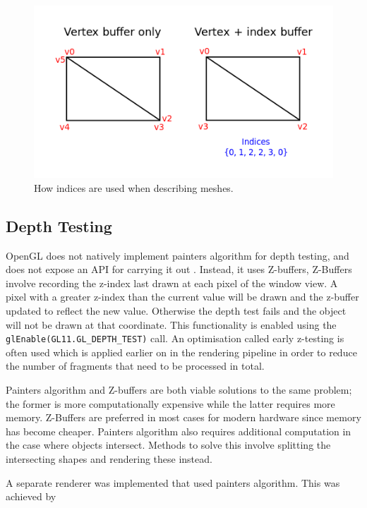 \documentclass[12pt]{article}
\begin{document}
\begin{figure}[!ht]
	\centering
	\includegraphics[width=\linewidth]{images/vertex_vs_index}
	\caption{How indices are used when describing meshes.}
	\label{fig:index_mesh}
\end{figure}

\subsection{Depth Testing}

OpenGL does not natively implement painters algorithm for depth testing, and does not expose an API for carrying it out .
Instead, it uses Z-buffers, 
Z-Buffers involve recording the z-index last drawn at each pixel of the window view. 
A pixel with a greater z-index than the current value will be drawn and the z-buffer updated to reflect the new value.
Otherwise the depth test fails and the object will not be drawn at that coordinate.
This functionality is enabled using the \texttt{glEnable(GL11.GL\_DEPTH\_TEST)} call.
An optimisation called early z-testing is often used which is applied earlier on in the rendering pipeline in order to reduce the number of fragments that need to be processed in total.

Painters algorithm and Z-buffers are both viable solutions to the same problem; the former is more computationally expensive while the latter requires more memory.
Z-Buffers are preferred in most cases for modern hardware since memory has become cheaper. 
Painters algorithm also requires additional computation in the case where objects intersect. 
Methods to solve this involve splitting the intersecting shapes and rendering these instead.

A separate renderer was implemented that used painters algorithm.
This was achieved by 

\printbibliography
\end{document}
